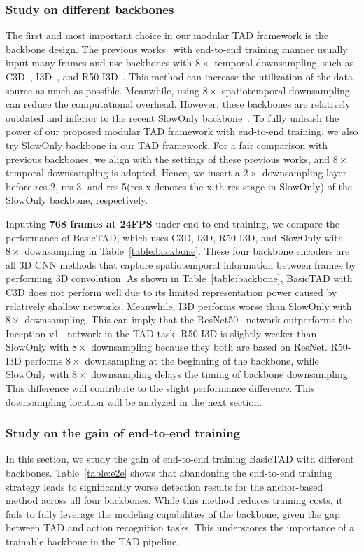 \documentclass[a4paper,fleqn]{cas-dc}
\begin{document}
\subsubsection{Study on different backbones}
The first and most important choice in our modular TAD framework is the backbone design.
The previous works~\citep{rgb_enough,r-c3d,pbrnet,afsd,sparse-rcnn-tad} with end-to-end training manner usually input many frames and use backbones with $8\times$ temporal downsampling, such as C3D~\citep{c3d}, I3D~\citep{i3d}, and R50-I3D~\citep{r50-i3d-non-local}.
This method can increase the utilization of the data source as much as possible. Meanwhile, using $8\times$ spatiotemporal downsampling can reduce the computational overhead. 
However, these backbones are relatively outdated and inferior to the recent SlowOnly backbone~\citep{slowfast}. To fully unleash the power of our proposed modular TAD framework with end-to-end training, we also try SlowOnly backbone in our TAD framework.
For a fair comparison with previous backbones, we align with the settings of these previous works, and $8\times$ temporal downsampling is adopted. 
Hence, we insert a $2\times$ downsampling layer before res-2, res-3, and res-5(res-x denotes the x-th res-stage in SlowOnly) of the SlowOnly backbone, respectively. 

Inputting \textbf{768 frames at 24FPS} under end-to-end training, we compare the performance of BasicTAD, which uses C3D, I3D, R50-I3D, and SlowOnly with $8\times$ downsampling in Table~\ref{table:backbone}.
These four backbone encoders are all 3D CNN methods that capture spatiotemporal information between frames by performing 3D convolution. 
As shown in Table~\ref{table:backbone}, BasicTAD with C3D does not perform well due to its limited representation power caused by relatively shallow networks. 
Meanwhile, I3D performs worse than SlowOnly with $8\times$ downsampling. This can imply that the ResNet50~\citep{resnet} network outperforms the Inception-v1~\citep{bn-inception} network in the TAD task.
R50-I3D is slightly weaker than SlowOnly with $8\times$ downsampling because they both are based on ResNet. R50-I3D performs $8\times$ downsampling at the beginning of the backbone, while SlowOnly with $8\times$ downsampling delays the timing of backbone downsampling. This difference will contribute to the slight performance difference. This downsampling location will be analyzed in the next section.


\subsubsection{Study on the gain of end-to-end training}
In this section, we study the gain of end-to-end training BasicTAD with different backbones. 
Table~\ref{table:e2e} shows that abandoning the end-to-end training strategy leads to significantly worse detection results for the anchor-based method across all four backbones. 
While this method reduces training costs, it fails to fully leverage the modeling capabilities of the backbone, given the gap between TAD and action recognition tasks.
This underscores the importance of a trainable backbone in the TAD pipeline.
\end{document}

